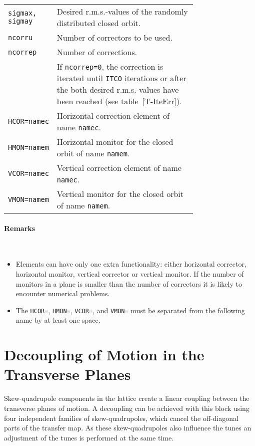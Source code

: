 \bigskip
\begin{longtabu}{@{}lp{0.75\linewidth}}
    \texttt{sigmax, sigmay} & Desired r.m.s.-values of the randomly distributed closed orbit. \\
    \texttt{ncorru}         & Number of correctors to be used. \\
    \texttt{ncorrep}        & Number of corrections. \\
                            & If \texttt{ncorrep=0}, the correction is iterated until \texttt{ITCO} iterations or after the both desired r.m.s.-values have been reached (see table~\ref{T-IteErr}). \\
    \texttt{HCOR=namec}     & Horizontal correction element of name \texttt{namec}. \\
    \texttt{HMON=namem}     & Horizontal monitor for the closed orbit of name \texttt{namem}. \\
    \texttt{VCOR=namec}     & Vertical correction element of name \texttt{namec}. \\
    \texttt{VMON=namem}     & Vertical monitor for the closed orbit of name \texttt{namem}.
\end{longtabu}

\paragraph{Remarks}~

\begin{itemize}
    \item Elements can have only one extra functionality: either horizontal corrector, horizontal monitor, vertical corrector or   vertical monitor. If the number of monitors in a plane is smaller than the number of correctors it is likely to encounter numerical problems.
    \item The \texttt{HCOR=}, \texttt{HMON=}, \texttt{VCOR=}, and \texttt{VMON=} must be separated from the following name by at least one space.
\end{itemize}

\section{Decoupling of Motion in the Transverse Planes} \label{LinDec} 

Skew-quadrupole components in the lattice create a linear coupling between the transverse planes of motion.
A decoupling can be achieved with this block using four independent families of skew-quadrupoles, which cancel the off-diagonal parts of the transfer map.
As these skew-quadrupoles also influence the tunes an adjustment of the tunes is performed at the same time.

